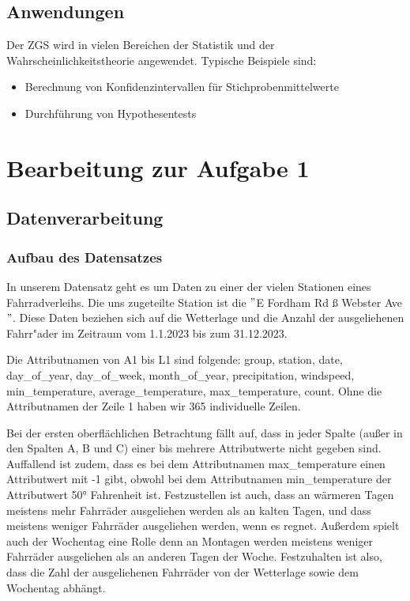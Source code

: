 \documentclass{article}
\begin{document}
\subsection{Anwendungen}
Der ZGS wird in vielen Bereichen der Statistik und der Wahrscheinlichkeitstheorie angewendet. Typische Beispiele sind:
\begin{itemize}
\item Berechnung von Konfidenzintervallen für Stichprobenmittelwerte\cite{studysmarter}
\item Durchführung von Hypothesentests\cite{studysmarter}
\end{itemize}

\newpage
\section{Bearbeitung zur Aufgabe 1}

\subsection{Datenverarbeitung}
\subsubsection{Aufbau des Datensatzes}
In unserem Datensatz geht es um Daten zu einer der vielen Stationen eines Fahrradverleihs. Die uns zugeteilte Station ist die $"$E Fordham Rd ß Webster Ave$"$. Diese Daten beziehen sich auf die Wetterlage und die Anzahl der ausgeliehenen Fahrr"ader im Zeitraum vom 1.1.2023 bis zum 31.12.2023.


Die Attributnamen von A1 bis L1 sind folgende: group, station, date, day\_of\_year, day\_of\_week, month\_of\_year, precipitation, windspeed, min\_temperature, average\_temperature, max\_temperature, count. Ohne die Attributnamen der Zeile 1 haben wir 365 individuelle Zeilen.


Bei der ersten oberflächlichen Betrachtung fällt auf, dass in jeder Spalte (außer in den Spalten A, B und C) einer bis mehrere Attributwerte nicht gegeben sind. Auffallend ist zudem, dass es bei dem Attributnamen max\_temperature einen Attributwert mit -1 gibt, obwohl bei dem Attributnamen min\_temperature der Attributwert \ang{50} Fahrenheit ist. Festzustellen ist auch, dass an wärmeren Tagen meistens mehr Fahrräder ausgeliehen werden als an kalten Tagen, und dass meistens weniger Fahrräder ausgeliehen werden, wenn es regnet. Außerdem spielt auch der Wochentag eine Rolle denn an Montagen werden meistens weniger Fahrräder ausgeliehen als an anderen Tagen der Woche. Festzuhalten ist also, dass die Zahl der ausgeliehenen Fahrräder von der Wetterlage sowie dem Wochentag abhängt.  
\end{document}
